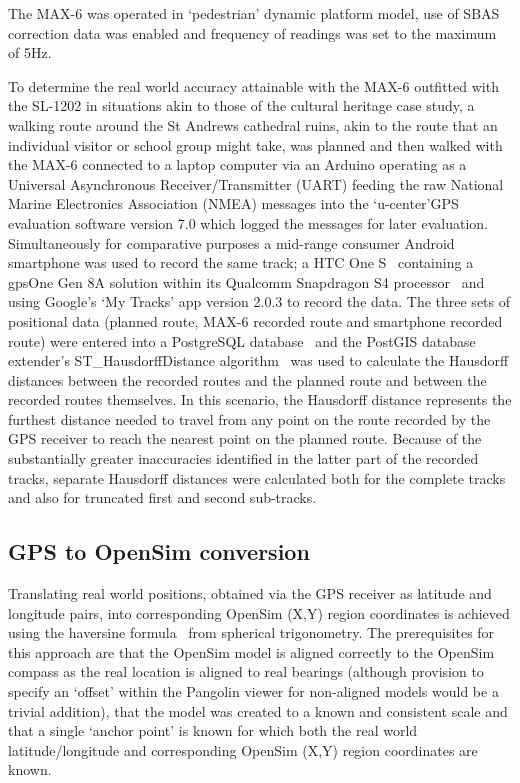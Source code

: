 The MAX-6 was operated in `pedestrian' dynamic platform model, use of SBAS correction data was enabled and frequency of readings was set to the maximum of 5Hz.

To determine the real world accuracy attainable with the MAX-6 outfitted with the SL-1202 in situations akin to those of the cultural heritage case study, a walking route around the St Andrews cathedral ruins, akin to the route that an individual visitor or school group might take, was planned and then walked with the MAX-6 connected to a laptop computer via an Arduino operating as a Universal Asynchronous Receiver/Transmitter (UART) feeding the raw National Marine Electronics Association (NMEA) messages into the `u-center'GPS evaluation software version 7.0 which logged the messages for later evaluation. Simultaneously for comparative purposes a mid-range consumer Android smartphone was used to record the same track; a HTC One S~\cite{HTCCorporation2013} containing a gpsOne Gen 8A solution within its Qualcomm Snapdragon S4 processor~\cite{QualcommIncorporated2013} and using Google's `My Tracks' app version 2.0.3 to record the data. The three sets of positional data (planned route, MAX-6 recorded route and smartphone recorded route) were entered into a PostgreSQL database~\cite{Daviesc,Daviesb} and the PostGIS database extender's ST\_HausdorffDistance algorithm~\cite{PostGIS} was used to calculate the Hausdorff distances between the recorded routes and the planned route and between the recorded routes themselves. In this scenario, the Hausdorff distance represents the furthest distance needed to travel from any point on the route recorded by the GPS receiver to reach the nearest point on the planned route. Because of the substantially greater inaccuracies identified in the latter part of the recorded tracks, separate Hausdorff distances were calculated both for the complete tracks and also for truncated first and second sub-tracks.

\subsection{GPS to OpenSim conversion}
Translating real world positions, obtained via the GPS receiver as latitude and longitude pairs, into corresponding OpenSim (X,Y) region coordinates is achieved using the haversine formula~\cite{Gellert1989} from spherical trigonometry. The prerequisites for this approach are that the OpenSim model is aligned correctly to the OpenSim compass as the real location is aligned to real bearings (although provision to specify an `offset' within the Pangolin viewer for non-aligned models would be a trivial addition), that the model was created to a known and consistent scale and that a single `anchor point' is known for which both the real world latitude/longitude and corresponding OpenSim (X,Y) region coordinates are known.

